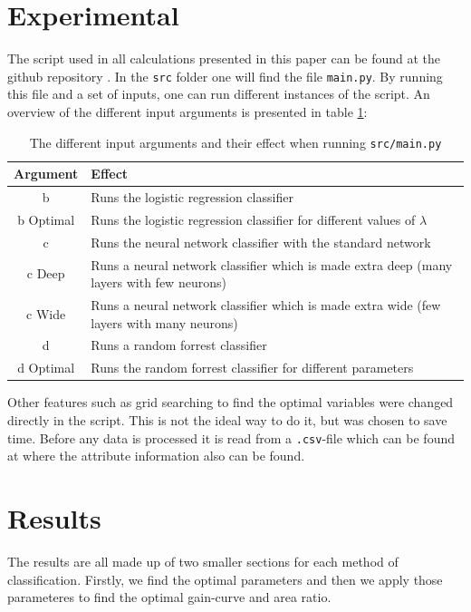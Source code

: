\documentclass[12pt]{article}
\numberwithin{figure}{section}
\begin{document}
\section{Experimental}
The script used in all calculations presented in this paper can be found at the github repository \cite{github}. In the \texttt{src} folder one will find the file \texttt{main.py}. By running this file and a set of inputs, one can run different instances of the script. An overview of the different input arguments is presented in table \ref{tabE:sysargv}:
\begin{table}[H]
\centering
\begin{tabular}{c|p{10cm}}
Argument & Effect \\ \hline
b & Runs the logistic regression classifier \\ \hline
b Optimal & Runs the logistic regression classifier for different values of $\lambda$ \\ \hline
c & Runs the neural network classifier with the standard network \\ \hline
c Deep & Runs a neural network classifier which is made extra deep (many layers with few neurons) \\ \hline
c Wide & Runs a neural network classifier which is made extra wide (few layers with many neurons) \\ \hline
d & Runs a random forrest classifier \\ \hline
d Optimal & Runs the random forrest classifier for different parameters \\ \hline
\end{tabular}
\caption{The different input arguments and their effect when running \texttt{src/main.py}}
\label{tabE:sysargv}
\end{table}
Other features such as grid searching to find the optimal variables were changed directly in the script. This is not the ideal way to do it, but was chosen to save time.
Before any data is processed it is read from a \texttt{.csv}-file which can be found at \cite{UCI} where the attribute information also can be found.
\section{Results}
The results are all made up of two smaller sections for each method of classification. Firstly, we find the optimal parameters and then we apply those parameteres to find the optimal gain-curve and area ratio.
\end{document}
